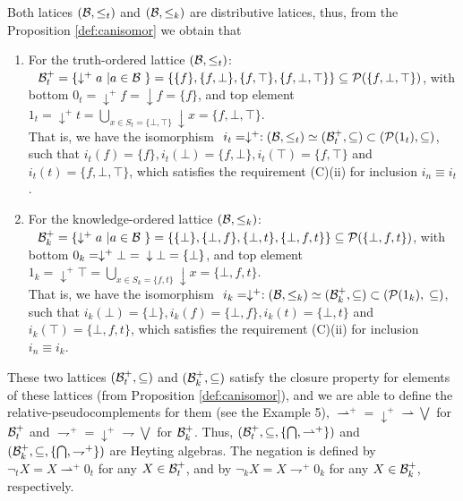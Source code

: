 \documentclass[10pt,twocolumn]{article}
\begin{document}
Both latices $(\mathcal{B}, \leq_t)$ and $(\mathcal{B}, \leq_k)$ are distributive
latices, thus, from the Proposition \ref{def:canisomor} we obtain
that
\begin{enumerate}
  \item For the truth-ordered lattice $(\mathcal{B},\leq_t)$:
 $~~\mathcal{B}^+_t =
\{\downarrow^+ a ~| a \in \mathcal{B}~\} =\\
\{\{f\},\{f,\bot\},\{f,\top\},\{f,\bot,\top\}\} \subseteq
\mathcal{P}(\{f,\bot,\top\})$, with bottom $0_t = \downarrow^+ f = \downarrow
f = \{f\}$, and top element $1_t = \downarrow^+ t = \bigcup_{x\in
S_t = \{\bot, \top\}} \downarrow x =
\{f,\bot,\top\}$.\\
That is, we have the isomorphism $~i_t = \downarrow^+:(\mathcal{B},\leq_t)
\simeq (\mathcal{B}^+_t, \subseteq)\subset (\mathcal{P}(1_t), \subseteq)$,
 such that  $i_t(f) = \{f\}, i_t(\bot) = \{f,\bot\}, i_t(\top) =
 \{f,\top\}$ and $i_t(t) = \{f,\bot,\top\}$, which satisfies the requirement (C)(ii) for inclusion  $i_n \equiv i_t$.
\item For the knowledge-ordered lattice $(\mathcal{B},\leq_k)$:
$~~\mathcal{B}^+_k = \{\downarrow^+ a ~| a \in \mathcal{B}~\} =\\
\{\{\bot\},\{\bot,f\},\{\bot,t\},\{\bot,f,t\}\} \subseteq
\mathcal{P}(\{\bot,f,t\})$, with bottom $0_k = \downarrow^+ \bot =\\
\downarrow \bot= \{\bot\}$, and top element $1_k = \downarrow^+ \top
= \bigcup_{x\in S_k = \{f, t \}} \downarrow x =
\{\bot,f,t\}$.\\
That is, we have the isomorphism $~i_k = \downarrow^+:(\mathcal{B},\leq_k)
\simeq (\mathcal{B}^+_k, \subseteq)\subset (\mathcal{P}(1_k),\\ \subseteq)$,
 such that  $i_k(\bot) = \{\bot\}, i_k(f) = \{\bot,f\}, i_k(t) =
 \{\bot,t\}$ and $i_k(\top) = \{\bot,f,t\}$, which satisfies the requirement (C)(ii) for inclusion  $i_n \equiv i_k$.
 \end{enumerate}
 These  two lattices $(\mathcal{B}^+_{t},
 \subseteq)$ and $(\mathcal{B}^+_{k},
 \subseteq)$ satisfy the
 closure property \cite{McTa46} for elements of these lattices (from
 Proposition \ref{def:canisomor}), and we are able to define the
 relative-pseudocomplements for them (see the Example 5),
 $\rightharpoonup^+ = \downarrow^+ \rightharpoonup \bigvee$
 for $\mathcal{B}^+_t$ and $\rightharpoondown^+ = \downarrow^+ \rightharpoondown \bigvee$
 for $\mathcal{B}^+_k$. Thus, $(\mathcal{B}^+_t,
 \subseteq, \{\bigcap, \rightharpoonup^+\} )$ and $(\mathcal{B}^+_k,
 \subseteq, \{\bigcap,\rightharpoondown^+\} )$ are Heyting
 algebras. The negation is defined by $\neg_t X = X
 \rightharpoonup^+ 0_t$ for any $X \in \mathcal{B}^+_t$, and by $\neg_k X = X
 \rightharpoondown^+ 0_k$ for any $X \in \mathcal{B}^+_k$, respectively.\\
\end{document}

